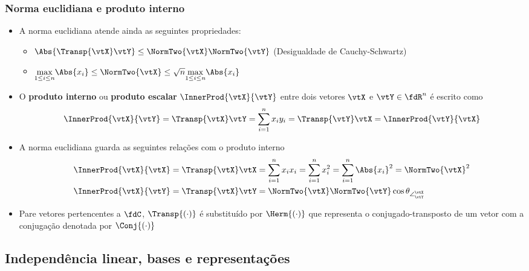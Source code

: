 \begin{frame}
  \frametitle{Norma euclidiana e produto interno~\cite[cap. 1]{Rugh1996}}
  \begin{itemize}\small
    \item A norma euclidiana atende ainda as seguintes propriedades:
    \begin{itemize}
      \item $\Abs{\Transp{\vtX}\vtY} \leq \NormTwo{\vtX}\NormTwo{\vtY}$ (Desigualdade de Cauchy-Schwartz)
      \item $\underset{1 \leq i \leq n}{\max} \Abs{x_i} \leq \NormTwo{\vtX} \leq \sqrt{n} \underset{1 \leq i \leq n}{\max}\Abs{x_i}$
    \end{itemize}
    \item O \textbf{\alert{produto interno}} ou \textbf{\alert{produto escalar}} $\InnerProd{\vtX}{\vtY}$ entre dois vetores $\vtX$ e $\vtY \in \fdR^n$ é escrito como
    \begin{equation}\label{eq_inner_prod}
      \InnerProd{\vtX}{\vtY} = \Transp{\vtX}\vtY = \sum\limits_{i=1}^n x_i y_i = \Transp{\vtY}\vtX = \InnerProd{\vtY}{\vtX}
    \end{equation}
    \item A norma euclidiana guarda as seguintes relações com o produto interno
    \begin{subequations}
      \begin{align}
        \InnerProd{\vtX}{\vtX} = \Transp{\vtX}\vtX &= \sum\limits_{i=1}^n x_i x_i = \sum\limits_{i=1}^n x^2_i = \sum\limits_{i=1}^n \Abs{x_i}^2 = \NormTwo{\vtX}^2 \\
        \InnerProd{\vtX}{\vtY} = \Transp{\vtX}\vtY &= \NormTwo{\vtX}\NormTwo{\vtY}\cos\theta_{\angle^{\vtX}_{\vtY}}
      \end{align}
    \end{subequations}
    \item Pare vetores pertencentes a $\fdC$, $\Transp{(\cdot)}$ é substituído por $\Herm{(\cdot)}$ que representa o conjugado-transposto de um vetor com a conjugação denotada por $\Conj{(\cdot)}$
  \end{itemize}
\end{frame}

\subsection{Independência linear, bases e representações}

